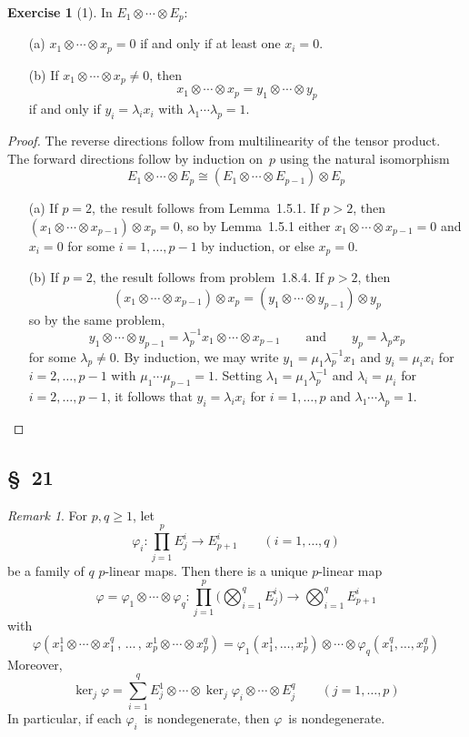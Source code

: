 \documentclass[letterpaper,12pt]{article}
\newcommand{\iso}{\cong}
\newcommand{\tprod}{\otimes}
\newcommand{\bigtprod}{\bigotimes}
\newcommand{\multi}[4]{#2_{#3}#1\cdots#1#2_{#4}}
\newcommand{\tprods}[3]{\multi{\tprod}{#1}{#2}{#3}}
\theoremstyle{definition}
\newtheorem*{exer}{Exercise}
\theoremstyle{remark}
\newtheorem*{rmk}{Remark}
\begin{document}
\begin{exer}[1]
In \(\tprods{E}{1}{p}\):
\begin{enumerate}
\item[(a)] \(\tprods{x}{1}{p}=0\) if and only if at least one \(x_i=0\).
\item[(b)] If \(\tprods{x}{1}{p}\ne 0\), then
\[\tprods{x}{1}{p}=\tprods{y}{1}{p}\]
if and only if \(y_i=\lambda_i x_i\) with \(\lambda_1\cdots\lambda_p=1\).
\end{enumerate}
\end{exer}
\begin{proof}
The reverse directions follow from multilinearity of the tensor product. The forward directions follow by induction on~\(p\) using the natural isomorphism
\[\tprods{E}{1}{p}\iso(\tprods{E}{1}{p-1})\tprod E_p\]
\begin{enumerate}
\item[(a)] If \(p=2\), the result follows from Lemma~1.5.1. If \(p>2\), then \((\tprods{x}{1}{p-1})\tprod x_p=0\), so by Lemma~1.5.1 either \(\tprods{x}{1}{p-1}=0\) and \(x_i=0\) for some \(i=1,\ldots,p-1\) by induction, or else \(x_p=0\).
\item[(b)] If \(p=2\), the result follows from problem~1.8.4. If \(p>2\), then
\[(\tprods{x}{1}{p-1})\tprod x_p=(\tprods{y}{1}{p-1})\tprod y_p\]
so by the same problem,
\[\tprods{y}{1}{p-1}=\lambda_p^{-1}\tprods{x}{1}{p-1}\qquad\text{and}\qquad y_p=\lambda_p x_p\]
for some \(\lambda_p\ne 0\). By induction, we may write \(y_1=\mu_1\lambda_p^{-1}x_1\) and \(y_i=\mu_i x_i\) for \(i=2,\ldots,p-1\) with \(\mu_1\cdots\mu_{p-1}=1\). Setting \(\lambda_1=\mu_1\lambda_p^{-1}\) and \(\lambda_i=\mu_i\) for \(i=2,\ldots,p-1\), it follows that \(y_i=\lambda_i x_i\) for \(i=1,\ldots,p\) and \(\lambda_1\cdots\lambda_p=1\).\qedhere
\end{enumerate}
\end{proof}

\subsection*{\S~21}
\begin{rmk}
For \(p,q\ge 1\), let
\[\varphi_i:\prod_{j=1}^p E^i_j\to E^i_{p+1}\qquad(i=1,\ldots,q)\]
be a family of \(q\) \(p\)-linear maps. Then there is a unique \(p\)-linear map
\[\varphi=\tprods{\varphi}{1}{q}:\prod_{j=1}^p\Biggl(\bigtprod_{i=1}^q E^i_j\Biggr)\to\bigtprod_{i=1}^q E^i_{p+1}\]
with
\[\varphi(x^1_1\tprod\cdots\tprod x^q_1\,,\,\ldots\,,\,x^1_p\tprod\cdots\tprod x^q_p)=\varphi_1(x^1_1,\ldots,x^1_p)\tprod\cdots\tprod\varphi_q(x^q_1,\ldots,x^q_p)\]
Moreover,
\[\ker_j\varphi=\sum_{i=1}^q E^1_j\tprod\cdots\tprod\ker_j\varphi_i\tprod\cdots\tprod E^q_j\qquad(j=1,\ldots,p)\]
In particular, if each \(\varphi_i\)~is nondegenerate, then \(\varphi\)~is nondegenerate.
\end{rmk}
\end{document}
